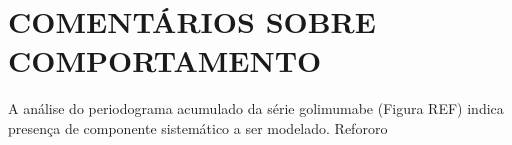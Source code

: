 \section{COMENTÁRIOS SOBRE
COMPORTAMENTO}\label{comentuxe1rios-sobre-comportamento}

A análise do periodograma acumulado da série golimumabe (Figura REF)
indica presença de componente sistemático a ser modelado. Refororo
